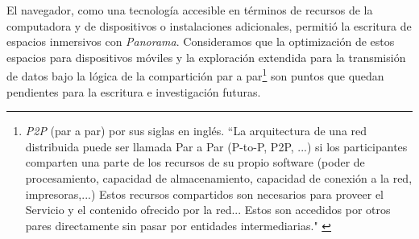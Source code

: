 


El navegador, como una tecnología accesible en términos de recursos de la computadora y de dispositivos o instalaciones adicionales, permitió la escritura de espacios inmersivos con \textit{Panorama}. Consideramos que la optimización de estos espacios para dispositivos móviles y la exploración extendida para la transmisión de datos bajo la lógica de la compartición par a par\footnote{\textit{P2P} (par a par) por sus siglas en inglés.  ``La arquitectura de una red distribuida puede ser llamada Par a Par (P-to-P, P2P, ...)  si los participantes comparten una parte de los recursos de su propio software (poder de procesamiento, capacidad de almacenamiento, capacidad de conexión a la red, impresoras,...) Estos recursos compartidos son necesarios para proveer el Servicio y el contenido ofrecido por la red... Estos son accedidos por otros pares directamente sin pasar por entidades intermediarias." \citep{p2p}} son puntos que quedan pendientes para la escritura e investigación futuras. 

